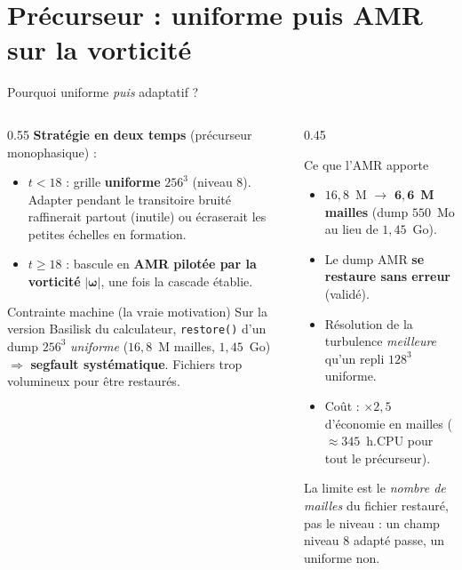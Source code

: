 \documentclass[11pt,aspectratio=169]{beamer}
\begin{document}
\section{Précurseur : uniforme puis AMR sur la vorticité}
\begin{frame}{Pourquoi uniforme \emph{puis} adaptatif ?}
  \begin{columns}[T]
    \begin{column}{0.55\textwidth}
      \textbf{Stratégie en deux temps} (précurseur monophasique) :
      \begin{itemize}
        \item $t < 18$ : grille \textbf{uniforme} $256^3$ (niveau 8).
              Adapter pendant le transitoire bruité raffinerait partout
              (inutile) ou écraserait les petites échelles en formation.
        \item $t \geq 18$ : bascule en \textbf{AMR pilotée par la vorticité}
              $|\boldsymbol\omega|$, une fois la cascade établie.
      \end{itemize}
      \vspace{0.3em}
      \begin{alertblock}{Contrainte machine (la vraie motivation)}
        Sur la version Basilisk du calculateur, \texttt{restore()} d'un dump
        $256^3$ \emph{uniforme} ($16{,}8$~M mailles, $1{,}45$~Go)
        $\Rightarrow$ \textbf{segfault systématique}. Fichiers trop
        volumineux pour être restaurés.
      \end{alertblock}
    \end{column}
    \begin{column}{0.45\textwidth}
      \begin{block}{Ce que l'AMR apporte}
        \footnotesize
        \begin{itemize}
          \item $16{,}8$~M $\to$ $\mathbf{6{,}6}$~\textbf{M mailles}
                (dump $550$~Mo au lieu de $1{,}45$~Go).
          \item Le dump AMR \textbf{se restaure sans erreur} (validé).
          \item Résolution de la turbulence \emph{meilleure} qu'un repli
                $128^3$ uniforme.
          \item Coût : $\times 2{,}5$ d'économie en mailles
                ($\approx 345$~h.CPU pour tout le précurseur).
        \end{itemize}
      \end{block}
      \footnotesize
      La limite est le \emph{nombre de mailles} du fichier restauré,
      pas le niveau : un champ niveau 8 adapté passe, un uniforme non.
    \end{column}
  \end{columns}
\end{frame}
\end{document}
